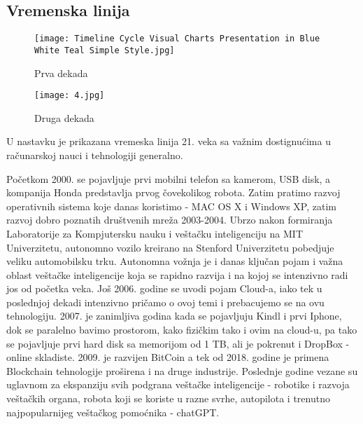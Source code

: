 \documentclass[a4paper]{article}
\begin{document}
{\subsection{Vremenska linija}


\begin{figure}[h!]
\begin{center}
\texttt{[image: Timeline Cycle Visual Charts Presentation in Blue White Teal Simple Style.jpg]}
\end{center}
\caption{Prva dekada}
\label{fig:kvant}
\end{figure}
\begin{figure}[h!]
\begin{center}
\texttt{[image: 4.jpg]}
\end{center}
\caption{Druga dekada}
\label{fig:kvant}
\end{figure}


U nastavku je prikazana vremeska linija 21. veka sa važnim dostignućima u računarskoj nauci i tehnologiji generalno. 

Početkom 2000. se pojavljuje prvi mobilni telefon sa kamerom, USB disk, a kompanija Honda predstavlja prvog čovekolikog robota. Zatim pratimo razvoj operativnih sistema koje danas koristimo - MAC OS X i Windows XP, zatim razvoj dobro poznatih društvenih mreža 2003-2004. Ubrzo nakon formiranja Laboratorije za Kompjutersku nauku i veštačku inteligenciju na MIT Univerzitetu, autonomno vozilo kreirano na Stenford Univerzitetu pobedjuje veliku automobilsku trku. Autonomna vožnja je i danas ključan pojam i važna oblast veštačke inteligencije koja se rapidno razvija i na kojoj se intenzivno radi jos od početka veka. Još 2006. godine se uvodi pojam Cloud-a, iako tek u poslednjoj dekadi intenzivno pričamo o ovoj temi i prebacujemo se na ovu tehnologiju. 2007. je zanimljiva godina kada se pojavljuju Kindl i prvi Iphone, dok se paralelno bavimo prostorom, kako fizičkim tako i ovim na cloud-u, pa tako se pojavljuje prvi hard disk sa memorijom od 1 TB, ali je pokrenut i DropBox - online skladiste. 2009. je razvijen BitCoin a tek od 2018. godine je primena Blockchain tehnologije proširena i na druge industrije. Poslednje godine vezane su uglavnom za ekspanziju svih podgrana veštačke inteligencije - robotike i razvoja veštačkih organa, robota koji se koriste u razne svrhe, autopilota i trenutno najpopularnijeg veštačkog pomoćnika - chatGPT.

\setlength{\parskip}{1em}



}
\end{document}
